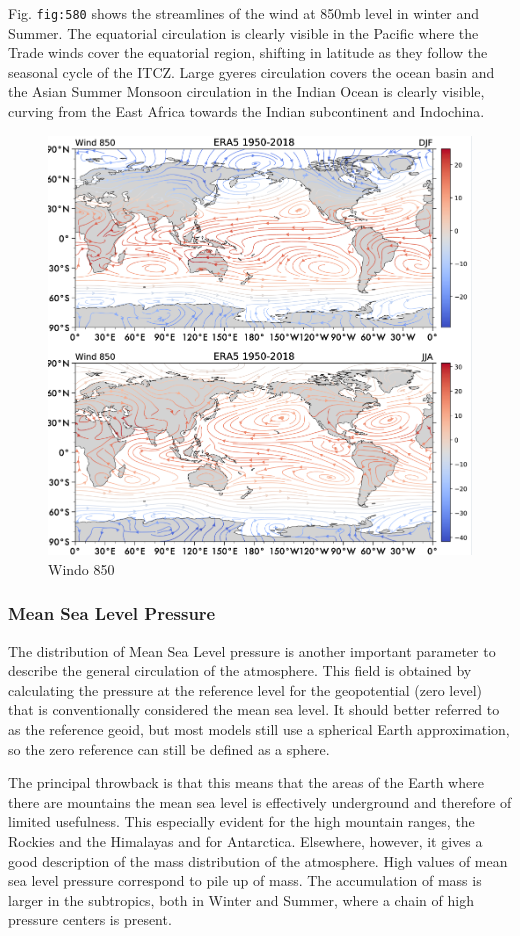 Fig. \texttt{fig:580} shows the streamlines of the wind at 850mb level
in winter and Summer. The equatorial circulation is clearly visible in
the Pacific where the Trade winds cover the equatorial region, shifting
in latitude as they follow the seasonal cycle of the ITCZ. Large gyeres
circulation covers the ocean basin and the Asian Summer Monsoon
circulation in the Indian Ocean is clearly visible, curving from the
East Africa towards the Indian subcontinent and Indochina.

\begin{figure}[h!]
    \centering
    \includegraphics[width=0.5\linewidth]{uploads/Screenshot 2024-11-19 133008.png}
    \caption{Windo 850}
    \label{fig:enter-label}
\end{figure}


\subsubsection{Mean Sea Level Pressure}\label{mean-sea-level-pressure}

The distribution of Mean Sea Level pressure is another important
parameter to describe the general circulation of the atmosphere. This
field is obtained by calculating the pressure at the reference level for
the geopotential (zero level) that is conventionally considered the mean
sea level. It should better referred to as the reference geoid, but most
models still use a spherical Earth approximation, so the zero reference
can still be defined as a sphere.

The principal throwback is that this means that the areas of the Earth
where there are mountains the mean sea level is effectively underground
and therefore of limited usefulness. This especially evident for the
high mountain ranges, the Rockies and the Himalayas and for Antarctica.
Elsewhere, however, it gives a good description of the mass distribution
of the atmosphere. High values of mean sea level pressure correspond to
pile up of mass. The accumulation of mass is larger in the subtropics,
both in Winter and Summer, where a chain of high pressure centers is
present.

